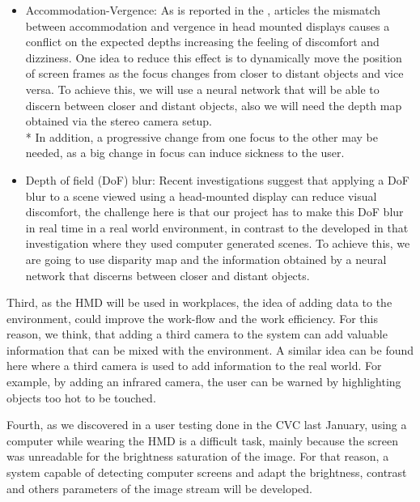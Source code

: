 \documentclass[10pt,a4paper,twocolumn,twoside]{article}
\begin{document}
	\begin{itemize}
		\item Accommodation-Vergence: As is reported in the \cite{disconfortReview}, \cite{vergenceDisconfort} articles the mismatch between accommodation and vergence in head mounted displays causes a conflict on the expected depths increasing the feeling of discomfort and dizziness.  One idea to reduce this effect is to dynamically move the position of screen frames as the focus changes from closer to distant objects and vice versa. To achieve this, we will use a neural network that will be able to discern between closer and distant objects, also we will need the depth map obtained via the stereo camera setup. \\*
		In addition, a progressive change from one focus to the other may be needed, as a big change in focus can induce sickness to the user.
		
		\item Depth of field (DoF) blur: Recent investigations \cite{ifftConfortDoF} suggest that applying a DoF blur to a scene viewed using a head-mounted display can reduce visual discomfort, the challenge here is that our project has to make this DoF blur in real time in a real world environment, in contrast to the developed in that investigation where they used computer generated scenes. To achieve this, we are going to use disparity map and the information obtained by a neural network that discerns between closer and distant objects.
	\end{itemize} 
	
	Third, as the HMD will be used in workplaces, the idea of adding data to the environment, could improve the work-flow and the work efficiency. For this reason, we think, that adding a third camera to the system can add valuable information that can be mixed with the environment. A similar idea can be found here \cite{vismerge} where a third camera is used to add information to the real world. For example, by adding an infrared camera, the user can be warned by highlighting objects too hot to be touched.
	
	Fourth, as we discovered in a user testing done in the CVC \cite{unpublishCVC} last January, using a computer while wearing the HMD is a difficult task, mainly because the screen was unreadable for the brightness saturation of the image. For that reason, a system capable of detecting computer screens and adapt the brightness, contrast and others parameters of the image stream will be developed.
	
\end{document}
